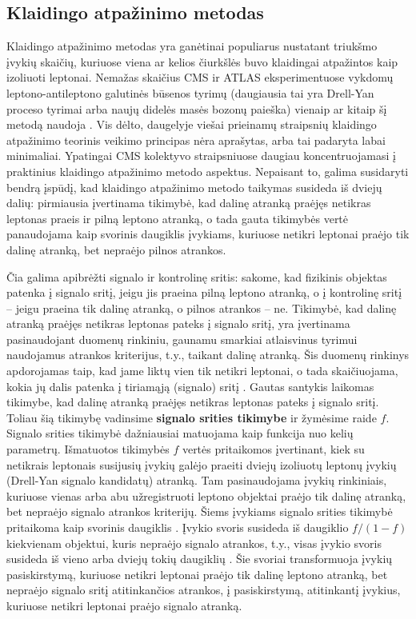\documentclass[a4paper, 12pt, oneside]{article}
\begin{document}
\subsection{Klaidingo atpažinimo metodas}\label{sec:FR}
Klaidingo atpažinimo metodas yra ganėtinai populiarus nustatant triukšmo įvykių skaičių, kuriuose viena ar kelios čiurkšlės
buvo klaidingai atpažintos kaip izoliuoti leptonai.
Nemažas skaičius CMS ir ATLAS eksperimentuose vykdomų leptono-antileptono galutinės būsenos tyrimų (daugiausia tai yra
Drell-Yan proceso tyrimai arba naujų didelės masės bozonų paieška) vienaip ar kitaip šį metodą naudoja
\cite{DY_CMS2011, DY_CMS2013, DY_ATLAS2013, DY_CMS2015, DY_ATLAS2016, DY_CMS2019, Z'_ATLAS2011, Z'_CMS2011, Z'_CMS2012,
Z'_CMS2013, Z'_ATLAS2014, Z'_CMS2015, Z'_CMS2017, Z'_CMS2018}.
Vis dėlto, daugelyje viešai prieinamų straipsnių klaidingo atpažinimo teorinis veikimo principas nėra aprašytas, arba tai padaryta
labai minimaliai.
Ypatingai CMS kolektyvo straipsniuose daugiau koncentruojamasi į praktinius klaidingo atpažinimo metodo aspektus.
Nepaisant to, galima susidaryti bendrą įspūdį, kad klaidingo atpažinimo metodo taikymas susideda iš dviejų dalių:
pirmiausia įvertinama tikimybė, kad dalinę atranką praėjęs netikras leptonas praeis ir pilną leptono atranką, o tada gauta
tikimybės vertė panaudojama kaip svorinis daugiklis įvykiams, kuriuose netikri leptonai praėjo tik dalinę atranką, bet 
nepraėjo pilnos atrankos.

Čia galima apibrėžti signalo ir kontrolinę sritis: sakome, kad fizikinis objektas patenka į signalo sritį, jeigu jis
praeina pilną leptono atranką, o į kontrolinę sritį -- jeigu praeina tik dalinę atranką, o pilnos atrankos -- ne.
Tikimybė, kad dalinę atranką praėjęs netikras leptonas pateks į signalo sritį, yra įvertinama pasinaudojant duomenų
rinkiniu, gaunamu smarkiai atlaisvinus tyrimui naudojamus atrankos kriterijus, t.y., taikant dalinę atranką.
Šis duomenų rinkinys apdorojamas taip, kad jame liktų vien tik netikri leptonai, o tada skaičiuojama, kokia jų
dalis patenka į tiriamąją (signalo) sritį \cite{DY_ATLAS2016, Z'_ATLAS2011, Z'_CMS2011, Z'_ATLAS2014, Z'_CMS2015}.
Gautas santykis laikomas tikimybe, kad dalinę atranką praėjęs netikras leptonas pateks į signalo sritį.
Toliau šią tikimybę vadinsime \textbf{signalo srities tikimybe} ir žymėsime raide $f$.
Signalo srities tikimybė dažniausiai matuojama kaip funkcija nuo kelių parametrų.
Išmatuotos tikimybės $f$ vertės pritaikomos įvertinant, kiek su netikrais leptonais susijusių įvykių galėjo praeiti dviejų
izoliuotų leptonų įvykių (Drell-Yan signalo kandidatų) atranką.
Tam pasinaudojama įvykių rinkiniais, kuriuose vienas arba abu užregistruoti leptono objektai praėjo tik dalinę atranką, bet
nepraėjo signalo atrankos kriterijų.
Šiems įvykiams signalo srities tikimybė pritaikoma kaip svorinis daugiklis \cite{Z'_ATLAS2011, Z'_CMS2011, Z'_CMS2015}.
Įvykio svoris susideda iš daugiklio $f/(1-f)$ kiekvienam objektui, kuris nepraėjo signalo atrankos, t.y., visas įvykio svoris
susideda iš vieno arba dviejų tokių daugiklių \cite{Z'_CMS2015}.
Šie svoriai transformuoja įvykių pasiskirstymą, kuriuose netikri leptonai praėjo tik dalinę leptono atranką,
bet nepraėjo signalo sritį atitinkančios atrankos, į pasiskirstymą, atitinkantį įvykius, kuriuose netikri leptonai
praėjo signalo atranką.
\end{document}
